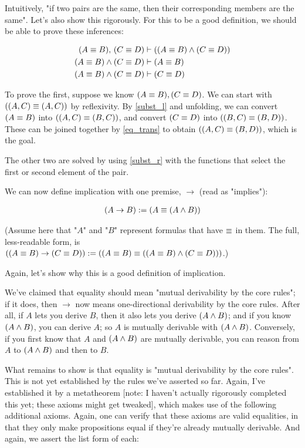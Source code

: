\documentclass{article}
\begin{document}
  Intuitively, "if two pairs are the same, then their corresponding members are the same". Let's also show this rigorously. For this to be a good definition, we should be able to prove these inferences:
  
  \begin{align*}
    (A \equiv B) ,\, (C \equiv D) &\vdash ((A \equiv B) \wedge (C \equiv D)) \\
    (A \equiv B) \wedge (C \equiv D) &\vdash (A \equiv B) \\
    (A \equiv B) \wedge (C \equiv D) &\vdash (C \equiv D) \\
  \end{align*}
  
  To prove the first, suppose we know $(A \equiv B), (C \equiv D)$. We can start with $((A,C) \equiv (A,C))$ by reflexivity. By \eqref{subst_l} and unfolding, we can convert $(A \equiv B)$ into $((A,C) \equiv (B,C))$, and convert $(C \equiv D)$ into $((B,C) \equiv (B,D))$. These can be joined together by \eqref{eq_trans} to obtain $((A,C) \equiv (B,D))$, which is the goal.
  
  The other two are solved by using \eqref{subst_r} with the functions that select the first or second element of the pair.
  
  We can now define implication with one premise, $\to$ (read as "implies"):
  
  \begin{align*}
    (A \to B) := (A \equiv (A \wedge B))
  \end{align*}
  
  (Assume here that "$A$" and "$B$" represent formulas that have $\equiv$ in them. The full, less-readable form, is $((A \equiv B) \to (C \equiv D)):= ((A \equiv B) \equiv ((A \equiv B) \wedge (C \equiv D)))$.)
  
  Again, let's show why this is a good definition of implication.
  
  We've claimed that equality should mean "mutual derivability by the core rules"; if it does, then $\to$ now means one-directional derivability by the core rules.
  After all, if $A$ lets you derive $B$, then it also lets you derive $(A \wedge B)$; and if you know $(A \wedge B)$, you can derive $A$; so $A$ is mutually derivable with $(A \wedge B)$.
  Conversely, if you first know that $A$ and $(A \wedge B)$ are mutually derivable, you can reason from $A$ to $(A \wedge B)$ and then to $B$.
  
  What remains to show is that equality is "mutual derivability by the core rules". This is not yet established by the rules we've asserted so far. Again, I've established it by a metatheorem [note: I haven't actually rigorously completed this yet; these axioms might get tweaked], which makes use of the following additional axioms. Again, one can verify that these axioms are valid equalities, in that they only make propositions equal if they're already mutually derivable. And again, we assert the list form of each:
  
\end{document}
